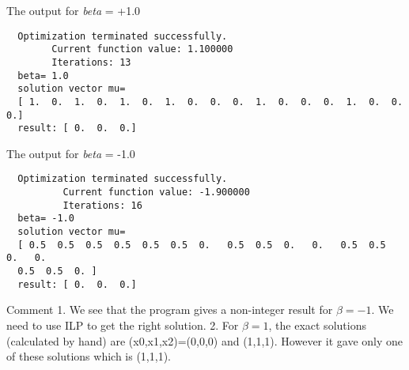 \documentclass[12pt,a4paper]{scrartcl}
\begin{document}
The output for \textit{beta} = +1.0
\begin{verbatim}
  Optimization terminated successfully.
        Current function value: 1.100000    
        Iterations: 13
  beta= 1.0
  solution vector mu=
  [ 1.  0.  1.  0.  1.  0.  1.  0.  0.  0.  1.  0.  0.  0.  1.  0.  0.  0.]
  result: [ 0.  0.  0.]
\end{verbatim}

The output for \textit{beta} = -1.0
\begin{verbatim}
  Optimization terminated successfully.
          Current function value: -1.900000   
          Iterations: 16
  beta= -1.0
  solution vector mu=
  [ 0.5  0.5  0.5  0.5  0.5  0.5  0.   0.5  0.5  0.   0.   0.5  0.5  0.   0.
  0.5  0.5  0. ]
  result: [ 0.  0.  0.]
\end{verbatim}

Comment
1. We see that the program gives a non-integer result for $\beta=-1$. We need to use ILP to get the right solution.
2. For \(\beta=1\), the exact solutions (calculated by hand) are (x0,x1,x2)=(0,0,0) and (1,1,1). However it gave only one of these solutions which is (1,1,1).

\clearpage

\end{document}
